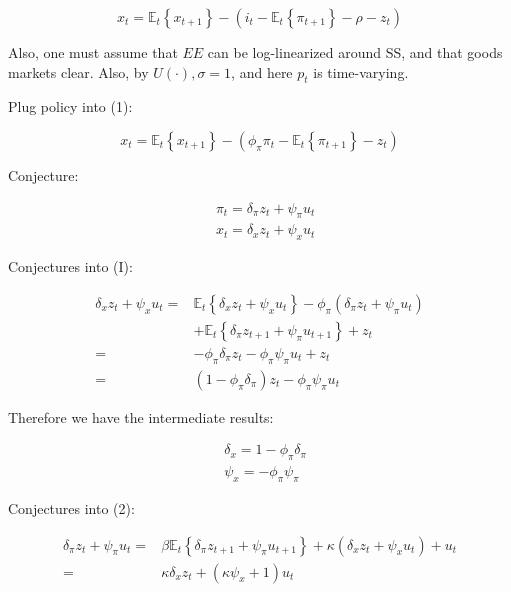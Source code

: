 {\begin{enumerate}[label=(\alph*)]
{$$
x_{t}=\mathbb{E}_{t}\left\{x_{t+1}\right\}-\left(i_{t}-\mathbb{E}_{t}\left\{\pi_{t+1}\right\}-\rho-z_{t}\right)
$$

Also, one must assume that $E E$ can be log-linearized around SS, and that goods markets clear. Also, by $U(\cdot), \sigma=1$, and here $p_{t}$ is time-varying.
}
{
\item 
Plug policy into (1):

\begin{equation*}
    x_{t}=\mathbb{E}_{t}\left\{x_{t+1}\right\}-\left(\phi_{\pi} \pi_{t}-\mathbb{E}_{t}\left\{\pi_{t+1}\right\}-z_{t}\right) \tag{I}
\end{equation*}

Conjecture:

$$
\begin{aligned}
& \pi_{t}=\delta_{\pi} z_{t}+\psi_{\pi} u_{t} \\
& x_{t}=\delta_{x} z_{t}+\psi_{x} u_{t}
\end{aligned}
$$

Conjectures into (I):

\begin{align*}
    \delta_{x} z_{t}+\psi_{x} u_{t} =&  \mathbb{E}_{t}\left\{\delta_{x} z_{t}+\psi_{x} u_{t}\right\} -\phi_{\pi}\left(\delta_{\pi} z_{t}+\psi_{\pi} u_{t}\right) \\
    &+\mathbb{E}_{t} \left\{ \delta_{\pi} z_{t+1}+\psi_{\pi} u_{t+1}\right\}+z_{t} \\
    =& -\phi_{\pi} \delta_{\pi} z_{t}-\phi_{\pi} \psi_{\pi} u_{t}+z_{t} \\
    =&\left(1-\phi_{\pi} \delta_{\pi}\right) z_{t}-\phi_{\pi} \psi_{\pi} u_{t}
\end{align*}

Therefore we have the intermediate results:

\begin{align*}
    & \delta_{x}=1-\phi_{\pi} \delta_{\pi}  \tag{II}\\
    & \psi_{x}=-\phi_{\pi} \psi_{\pi} \tag{III}
\end{align*}

Conjectures into (2):

\begin{align*}
\delta_{\pi} z_{t}+\psi_{\pi} u_{t} =& \beta \mathbb{E}_{t}\left\{ \delta_{\pi} z_{t+1}+\psi_{\pi} u_{t+1}\right\} + \kappa \left(\delta_{x} z_{t}+\psi_{x} u_{t}\right)+u_{t} \\
=& \kappa \delta_{x} z_{t}+\left(\kappa \psi_{x}+1\right) u_{t}
\end{align*}

}
\end{enumerate}}

